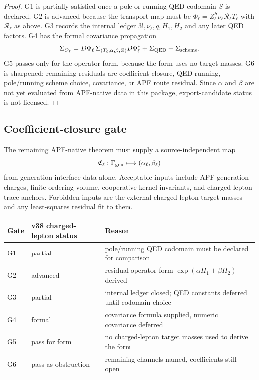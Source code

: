 \begin{proof}
G1 is partially satisfied once a pole or running-QED codomain \(S\) is declared.  G2 is advanced because the transport map must be \(\Phi_\ell=Z_\ell^S\nu_\ell\mathcal R_\ell T_\ell\) with \(\mathcal R_\ell\) as above.  G3 records the internal ledger \(3!,\nu_\ell,q,H_1,H_2\) and any later QED factors.  G4 has the formal covariance propagation
\[
        \Sigma_{O_\ell}
        =D\Phi_\ell\,\Sigma_{(T_\ell,\alpha,\beta,Z)}D\Phi_\ell^{*}
        +\Sigma_{\rm QED}+\Sigma_{\rm scheme}.
\]
G5 passes only for the operator form, because the form uses no target masses.  G6 is sharpened: remaining residuals are coefficient closure, QED running, pole/running scheme choice, covariance, or APF route residual.  Since \(\alpha\) and \(\beta\) are not yet evaluated from APF-native data in this package, export-candidate status is not licensed. \qedhere
\end{proof}

\subsection{Coefficient-closure gate}

\begin{definition}
The remaining APF-native theorem must supply a source-independent map
\[
        \mathfrak C_\ell:
        \Gamma_{\rm gen}\longmapsto(\alpha_\ell,\beta_\ell)
\]
from generation-interface data alone.  Acceptable inputs include APF generation charges, finite ordering volume, cooperative-kernel invariants, and charged-lepton trace anchors.  Forbidden inputs are the external charged-lepton target masses and any least-squares residual fit to them.
\end{definition}

\begin{center}
\renewcommand{\arraystretch}{1.2}
\begin{tabular}{lll}
\hline
\textbf{Gate} & \textbf{v38 charged-lepton status} & \textbf{Reason}\\
\hline
G1 & partial & pole/running QED codomain must be declared for comparison\\
G2 & advanced & residual operator form \(\exp(\alpha H_1+\beta H_2)\) derived\\
G3 & partial & internal ledger closed; QED constants deferred until codomain choice\\
G4 & formal & covariance formula supplied, numeric covariance deferred\\
G5 & pass for form & no charged-lepton target masses used to derive the form\\
G6 & pass as obstruction & remaining channels named, coefficients still open\\
\hline
\end{tabular}
\end{center}

